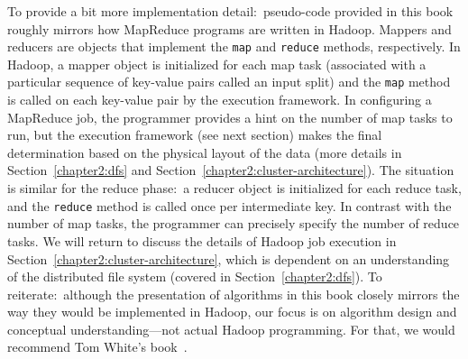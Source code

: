 \documentclass[11pt]{article}
\begin{document}
To provide a bit more implementation detail:\ pseudo-code provided in
this book roughly mirrors how MapReduce programs are written in
Hadoop.  Mappers and reducers are objects that implement
the \texttt{map} and \texttt{reduce} methods, respectively.  In
Hadoop, a mapper object is initialized for each map task (associated
with a particular sequence of key-value pairs called an input split)
and the \texttt{map} method is called on each key-value pair by the
execution framework.  In configuring a MapReduce job, the programmer
provides a hint on the number of map tasks to run, but the execution
framework (see next section) makes the final determination based on
the physical layout of the data (more details in
Section~\ref{chapter2:dfs} and
Section~\ref{chapter2:cluster-architecture}).  The situation is
similar for the reduce phase:\ a reducer object is initialized for
each reduce task, and the \texttt{reduce} method is called once per
intermediate key.  In contrast with the number of map tasks, the
programmer can precisely specify the number of reduce tasks.  We will
return to discuss the details of Hadoop job execution in
Section~\ref{chapter2:cluster-architecture}, which is dependent on an
understanding of the distributed file system (covered in
Section~\ref{chapter2:dfs}).  To reiterate:\ although the presentation
of algorithms in this book closely mirrors the way they would be
implemented in Hadoop, our focus is on algorithm design and conceptual
understanding---not actual Hadoop programming.  For that, we would
recommend Tom White's book~\cite{White_2009}.
\end{document}
